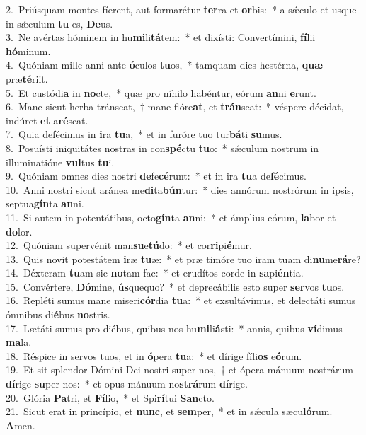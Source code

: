 {2.~}Priúsquam montes fíerent, aut formarétur \textbf{ter}ra et \textbf{or}bis:~* a sǽculo et usque in sǽculum \textbf{tu} es, \textbf{De}us.\\
{3.~}Ne avértas hóminem in hu\textbf{mi}li\textbf{tá}tem:~* et dixísti: Convertímini, \textbf{fí}lii \textbf{hó}minum.\\
{4.~}Quóniam mille anni ante \textbf{ó}culos \textbf{tu}os,~* tamquam dies hestérna, \textbf{quæ} præ\textbf{té}riit.\\
{5.~}Et custódi\textbf{a} in \textbf{no}cte,~* quæ pro níhilo habéntur, eórum \textbf{an}ni \textbf{e}runt.\\
{6.~}Mane sicut herba tránseat,~† mane flóre\textbf{at}, et \textbf{trán}seat:~* véspere décidat, indúret \textbf{et} a\textbf{ré}scat.\\
{7.~}Quia defécimus in \textbf{i}ra \textbf{tu}a,~* et in furóre tuo tur\textbf{bá}ti \textbf{su}mus.\\
{8.~}Posuísti iniquitátes nostras in con\textbf{spé}ctu \textbf{tu}o:~* sǽculum nostrum in illuminatióne \textbf{vul}tus \textbf{tu}i.\\
{9.~}Quóniam omnes dies nostri \textbf{de}fe\textbf{cé}runt:~* et in ira \textbf{tu}a de\textbf{fé}cimus.\\
{10.~}Anni nostri sicut aránea me\textbf{di}ta\textbf{bún}tur:~* dies annórum nostrórum in ipsis, septua\textbf{gín}ta \textbf{an}ni.\\
{11.~}Si autem in potentátibus, octo\textbf{gín}ta \textbf{an}ni:~* et ámplius eórum, \textbf{la}bor et \textbf{do}lor.\\
{12.~}Quóniam supervénit man\textbf{su}e\textbf{tú}do:~* et cor\textbf{ri}pi\textbf{é}mur.\\
{13.~}Quis novit potestátem \textbf{i}ræ \textbf{tu}æ:~* et præ timóre tuo iram tuam di\textbf{nu}me\textbf{rá}re?\\
{14.~}Déxteram \textbf{tu}am sic \textbf{no}tam fac:~* et erudítos corde in \textbf{sa}pi\textbf{én}tia.\\
{15.~}Convértere, \textbf{Dó}mine, \textbf{ús}quequo?~* et deprecábilis esto super \textbf{ser}vos \textbf{tu}os.\\
{16.~}Repléti sumus mane miseri\textbf{cór}dia \textbf{tu}a:~* et exsultávimus, et delectáti sumus ómnibus di\textbf{é}bus \textbf{no}stris.\\
{17.~}Lætáti sumus pro diébus, quibus nos hu\textbf{mi}li\textbf{á}sti:~* annis, quibus \textbf{ví}dimus \textbf{ma}la.\\
{18.~}Réspice in servos tuos, et in \textbf{ó}pera \textbf{tu}a:~* et dírige fíli\textbf{os} e\textbf{ó}rum.\\
{19.~}Et sit splendor Dómini Dei nostri super nos,~† et ópera mánuum nostrárum \textbf{dí}rige \textbf{su}per nos:~* et opus mánuum no\textbf{strá}rum \textbf{dí}rige.\\
{20.~}Glória \textbf{Pa}tri, et \textbf{Fí}lio,~* et Spi\textbf{rí}tui \textbf{San}cto.\\
{21.~}Sicut erat in princípio, et \textbf{nunc}, et \textbf{sem}per,~* et in sǽcula sæcu\textbf{ló}rum. \textbf{A}men.\\
